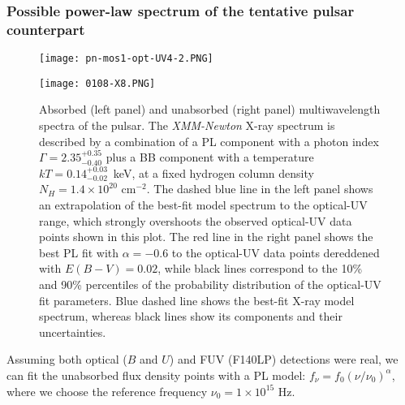 \documentclass[pdftex,twocolumn]{aastex62}
\newcommand{\gp}[1]{{\color{blue} #1}}
\begin{document}
\subsubsection{Possible power-law spectrum of the tentative pulsar counterpart}
\begin{figure*}[tbh!]
\begin{minipage}[h]{0.5\linewidth}
\texttt{[image: pn-mos1-opt-UV4-2.PNG]}
\end{minipage}
\hfill
\begin{minipage}[h]{0.5\linewidth}
\texttt{[image: 0108-X8.PNG]}
\end{minipage}
\caption{
Absorbed (left panel) and unabsorbed (right panel) multiwavelength spectra of the pulsar. The {\sl XMM-Newton} X-ray spectrum is described by a combination of a 
PL component with a photon index $\Gamma=2.35^{+0.35}_{-0.40}$ plus a 
BB component with a temperature $kT=0.14^{+0.03}_{-0.02}$~keV, at a fixed hydrogen column density 
$N_{H}=1.4\times10^{20}$  cm$^{-2}$.
The dashed blue line in the left panel shows an extrapolation of the best-fit model spectrum to the optical-UV range, which strongly overshoots %
the observed optical-UV data points  shown in this plot.  
The red line in the right panel shows the best PL fit with $\alpha=-0.6$ to the optical-UV data points dereddened with $E(B-V)=0.02$, while black lines correspond to the 10\% and 90\% percentiles of the probability distribution 
of the optical-UV fit parameters. Blue dashed line shows the best-fit X-ray model spectrum, whereas black lines show its components and their uncertainties. 
\label{fig:8}}
\end{figure*}
Assuming both optical ($B$ and $U$) and FUV (F140LP) detections were real, we can fit the unabsorbed flux density points with a %
PL model: $f_\nu = f_0 (\nu/\nu_0)^\alpha$, where we choose the reference frequency $\nu_0 = 1\times 10^{15}$ Hz.
\end{document}
